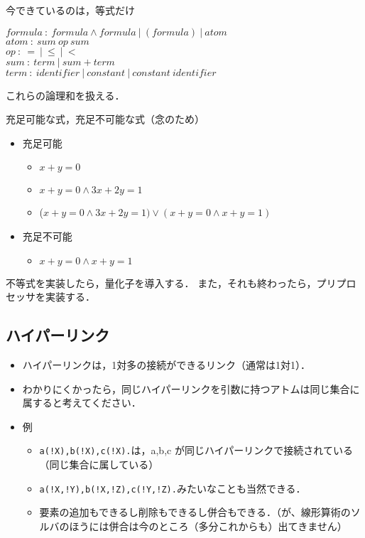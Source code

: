 今できているのは，等式だけ
\begin{center}
    $formula\: :\: formula\wedge formula \:|\: (formula) \:|\: atom$\\
    $atom \::\: sum \: op \: sum$\\
    $op \::\: = \:|\: $\sout{$\leq$}$ \:|\: $\sout{$<$}\\
    $sum \::\: term \:|\: sum+term$\\
    $term \::\: identifier \:|\: constant \:|\: constant \: identifier$
\end{center}

これらの論理和を扱える．

充足可能な式，充足不可能な式（念のため）
\renewcommand{\labelitemii}{$\circ$}
\begin{itemize}
    \item 充足可能
    \begin{itemize}
        \item $x + y = 0$
        \item $x + y = 0 \wedge 3x + 2y = 1$
        \item ($x + y = 0 \wedge 3x + 2y = 1) \vee
                (x + y = 0 \wedge x + y = 1)$
    \end{itemize}
    \item 充足不可能
    \begin{itemize}
        \item $x + y = 0 \wedge x + y = 1$
    \end{itemize}
\end{itemize}

不等式を実装したら，量化子を導入する．
また，それも終わったら，プリプロセッサを実装する．

\subsection*{ハイパーリンク}
\begin{itemize}
    \item ハイパーリンクは，1対多の接続ができるリンク（通常は1対1）．
    \item わかりにくかったら，同じハイパーリンクを引数に持つアトムは同じ集合に属すると考えてください．
    \item 例
    \begin{itemize}
        \item \texttt{a(!X),b(!X),c(!X).}は，a,b,c が同じハイパーリンクで接続されている（同じ集合に属している）
        \item \texttt{a(!X,!Y),b(!X,!Z),c(!Y,!Z).}みたいなことも当然できる．
        \item 要素の追加もできるし削除もできるし併合もできる．（が、線形算術のソルバのほうには併合は今のところ（多分これからも）出てきません）
    \end{itemize}
\end{itemize}







